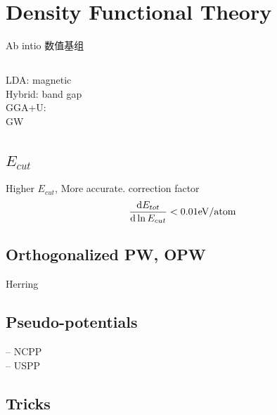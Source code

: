 \documentclass[a4paper]{article}
\numberwithin{equation}{section}
\begin{document}
\section{Density Functional Theory}
Ab intio
数值基组 

\subsection{}
LDA: magnetic\\
Hybrid: band gap\\
GGA+U:\\
GW\\

\section{}
\subsection{$ E_{cut} $}
Higher $ E_{cut} $, More accurate.
correction factor
\begin{equation}\label{key}
\dv{E_{tot}}{\ln E_{cut}} < 0.01\si{eV}/\text{atom}
\end{equation}

\subsection{Orthogonalized PW, OPW}
Herring

\subsection{Pseudo-potentials}
-- NCPP\\
-- USPP\\

\subsection{Tricks}
\end{document}
